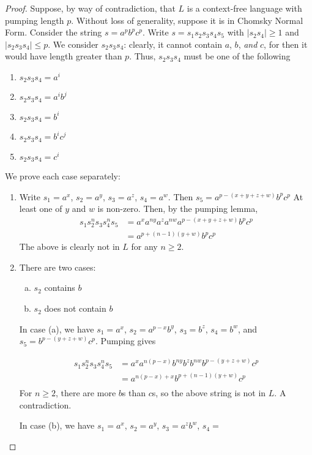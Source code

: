 \begin{proof}
    Suppose, by way of contradiction, that \(L\) is a context-free language with pumping length \(p\). Without loss of generality, suppose it is in Chomsky Normal Form. Consider the string \(s=a^p b^p c^p\). Write \(s=s_1 s_2 s_3 s_4 s_5\) with \(|s_2 s_4|\geq 1\) and \(|s_2 s_3 s_4|\leq p\). We consider \(s_2 s_3 s_4\): clearly, it cannot contain \(a\), \(b\), \textit{and} \(c\), for then it would have length greater than \(p\). Thus, \(s_2 s_3 s_4\) must be one of the following
    
    \begin{enumerate}[1.]
        \item \(s_2 s_3 s_4 = a^i\)
        \item \(s_2 s_3 s_4 = a^i b^j\)
        \item \(s_2 s_3 s_4 = b^i\)
        \item \(s_2 s_3 s_4 = b^i c^j\)
        \item \(s_2 s_3 s_4 = c^i\)
    \end{enumerate}

    We prove each case separately:

    \begin{enumerate}[1.]
        \item Write \(s_1=a^x\), \(s_2=a^y\), \(s_3=a^z\), \(s_4=a^w\). Then \(s_5=a^{p-(x+y+z+w)}b^p c^p\) At least one of \(y\) and \(w\) is non-zero. Then, by the pumping lemma, 
            \begin{align*} 
                s_1 s_2^n s_3 s_4^n s_5 &= a^x a^{ny} a^z a^{nw} a^{p-(x+y+z+w)}b^p c^p\\
                                        &= a^{p+(n-1)(y+w)}b^p c^p
            \end{align*}
            The above is clearly not in \(L\) for any \(n\geq 2\).
        \item There are two cases: 
            \begin{enumerate}[(a)]
                \item \(s_2\) contains \(b\)
                \item \(s_2\) does not contain \(b\)
            \end{enumerate}

            In case (a), we have \(s_1=a^x\), \(s_2=a^{p-x}b^y\), \(s_3=b^z\), \(s_4=b^w\), and \(s_5=b^{p-(y+z+w)}c^p\). Pumping gives 

            \begin{align*}
                s_1 s_2^n s_3 s_4^n s_5 &= a^x a^{n(p-x)} b^{ny} b^z b^{nw}b^{p-(y+z+w)}c^p \\
                                        &= a^{n(p-x)+x} b^{p+(n-1)(y+w)} c^p\\
            \end{align*}
            For \(n\geq 2\), there are more \(b\)s than \(c\)s, so the above string is not in \(L\). A contradiction.
            
            In case (b), we have \(s_1=a^x\), \(s_2=a^y\), \(s_3=a^z b^w\), \(s_4=\)
    \end{enumerate}
\end{proof}